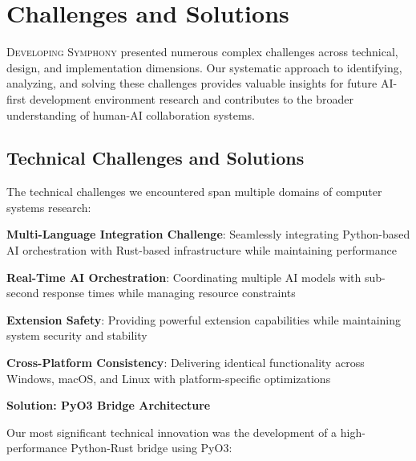 
\section*{Challenges and Solutions}

\lettrine{D}{eveloping Symphony} presented numerous complex challenges across technical, design, and implementation dimensions. Our systematic approach to identifying, analyzing, and solving these challenges provides valuable insights for future AI-first development environment research and contributes to the broader understanding of human-AI collaboration systems.

\subsection*{Technical Challenges and Solutions}

The technical challenges we encountered span multiple domains of computer systems research:

\begin{expandedlist}
    \item \textbf{Multi-Language Integration Challenge}: Seamlessly integrating Python-based AI orchestration with Rust-based infrastructure while maintaining performance
    \item \textbf{Real-Time AI Orchestration}: Coordinating multiple AI models with sub-second response times while managing resource constraints
    \item \textbf{Extension Safety}: Providing powerful extension capabilities while maintaining system security and stability
    \item \textbf{Cross-Platform Consistency}: Delivering identical functionality across Windows, macOS, and Linux with platform-specific optimizations
\end{expandedlist}

\textbf{Solution: PyO3 Bridge Architecture}

Our most significant technical innovation was the development of a high-performance Python-Rust bridge using PyO3:

